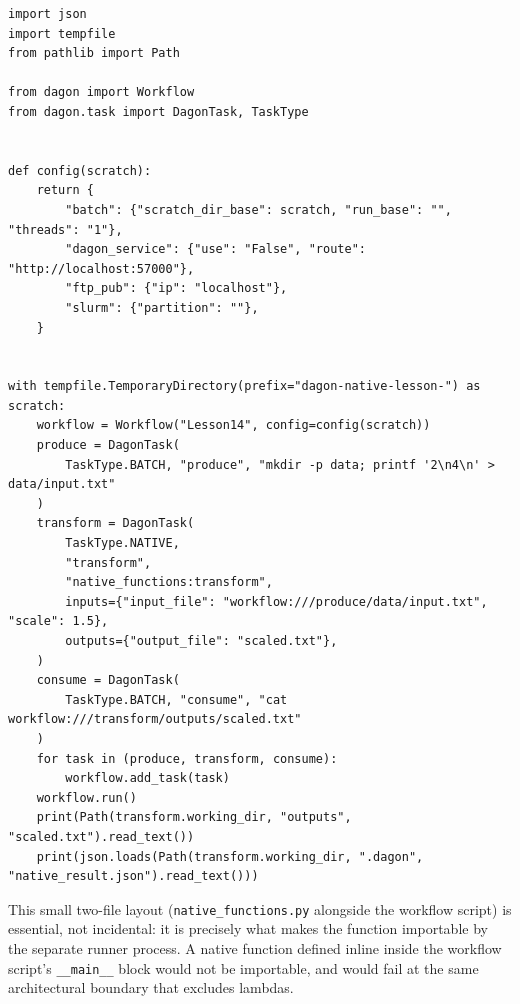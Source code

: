 \begin{lstlisting}[caption={\texttt{lesson\_14\_native\_tasks.py}: the workflow that calls it.}]
import json
import tempfile
from pathlib import Path

from dagon import Workflow
from dagon.task import DagonTask, TaskType


def config(scratch):
    return {
        "batch": {"scratch_dir_base": scratch, "run_base": "", "threads": "1"},
        "dagon_service": {"use": "False", "route": "http://localhost:57000"},
        "ftp_pub": {"ip": "localhost"},
        "slurm": {"partition": ""},
    }


with tempfile.TemporaryDirectory(prefix="dagon-native-lesson-") as scratch:
    workflow = Workflow("Lesson14", config=config(scratch))
    produce = DagonTask(
        TaskType.BATCH, "produce", "mkdir -p data; printf '2\n4\n' > data/input.txt"
    )
    transform = DagonTask(
        TaskType.NATIVE,
        "transform",
        "native_functions:transform",
        inputs={"input_file": "workflow:///produce/data/input.txt", "scale": 1.5},
        outputs={"output_file": "scaled.txt"},
    )
    consume = DagonTask(
        TaskType.BATCH, "consume", "cat workflow:///transform/outputs/scaled.txt"
    )
    for task in (produce, transform, consume):
        workflow.add_task(task)
    workflow.run()
    print(Path(transform.working_dir, "outputs", "scaled.txt").read_text())
    print(json.loads(Path(transform.working_dir, ".dagon", "native_result.json").read_text()))
\end{lstlisting}

\begin{practicebox}
This small two-file layout (\texttt{native\_functions.py} alongside the
workflow script) is essential, not incidental: it is precisely what makes the
function importable by the separate runner process. A native function
defined inline inside the workflow script's \texttt{\_\_main\_\_} block would
not be importable, and would fail at the same architectural boundary that
excludes lambdas.
\end{practicebox}

